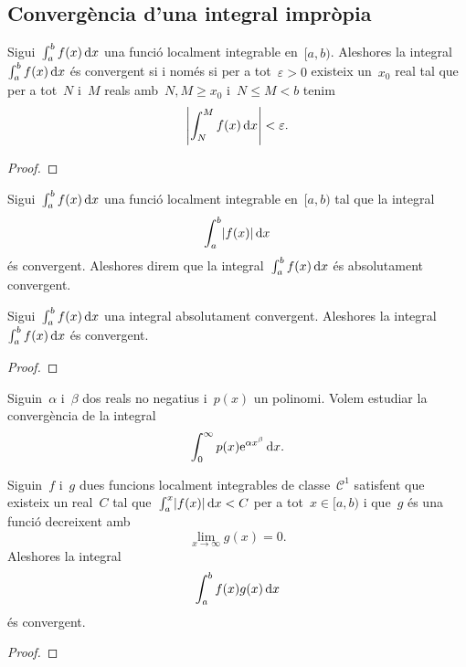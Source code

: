 \documentclass[../../main.tex]{subfiles}
\begin{document}
    \subsection{Convergència d'una integral impròpia}
    \begin{theorem}
        \label{thm:Condició de Cauchy per integrals impròpies}
        Sigui~\(\int_{a}^{b}f(x)\mathop{}\!\mathrm{d} x\) una funció localment integrable en~\([a,b)\).
        Aleshores la integral~\(\int_{a}^{b}f(x)\mathop{}\!\mathrm{d} x\) és convergent si i només si per a tot~\(\varepsilon>0\) existeix un~\(x_{0}\) real tal que per a tot~\(N\) i~\(M\) reals amb~\(N,M\geq x_{0}\) i~\(N\leq M<b\) tenim
        \[
            \abs{\int_{N}^{M}f(x)\diff x}<\varepsilon.
        \]
        \begin{proof}
        \end{proof}
    \end{theorem}
    \begin{definition}
        \label{def:convergència absoluta d'una integral impròpia}
        Sigui~\(\int_{a}^{b}f(x)\mathop{}\!\mathrm{d} x\) una funció localment integrable en~\([a,b)\) tal que la integral
        \[
            \int_{a}^{b}\abs{f(x)}\diff x
        \]
        és convergent.
        Aleshores direm que la integral~\(\int_{a}^{b}f(x)\mathop{}\!\mathrm{d} x\) és absolutament convergent.
    \end{definition}
    \begin{proposition}
        Sigui~\(\int_{a}^{b}f(x)\mathop{}\!\mathrm{d} x\) una integral absolutament convergent.
        Aleshores la integral~\(\int_{a}^{b}f(x)\mathop{}\!\mathrm{d} x\) és convergent.
        \begin{proof}
        \end{proof}
    \end{proposition}
    \begin{example}
        \label{ex:convèrgencia absoluta d'una integral impròpia amb un polinomi i una exponencial}
        Siguin~\(\alpha\) i~\(\beta\) dos reals no negatius i~\(p(x)\) un polinomi.
        Volem estudiar la convergència de la integral
        \[
            \int_{0}^{\infty}p(x)\mathrm{e}^{\alpha x^{\beta}}\mathop{}\!\mathrm{d} x.
        \]
        \begin{solution}
        \end{solution}
    \end{example}
    \begin{theorem}
        \label{thm:criteri de Dirichlet per integrals impròpies}
        Siguin~\(f\) i~\(g\) dues funcions localment integrables de classe~\(\mathcal{C}^{1}\) satisfent que existeix un real~\(C\) tal que~\(\int_{a}^{x}\abs{f(x)}\diff x<C\) per a tot~\(x\in[a,b)\) i que~\(g\) és una funció decreixent amb
        \[
            \lim_{x\to\infty}g(x)=0.
        \]
        Aleshores la integral
        \[
            \int_{a}^{b}f(x)g(x)\mathop{}\!\mathrm{d} x
        \]
        és convergent.
        \begin{proof}
        \end{proof}
    \end{theorem}
\end{document}
